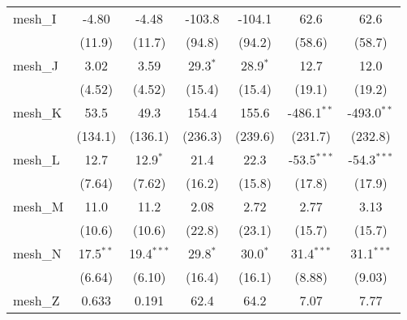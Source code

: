 \begin{tabular}{lcccccc}
   mesh\_I                                                     & -4.80          & -4.48          & -103.8         & -104.1         & 62.6          & 62.6\\   
                                                               & (11.9)         & (11.7)         & (94.8)         & (94.2)         & (58.6)        & (58.7)\\   
   mesh\_J                                                     & 3.02           & 3.59           & 29.3$^{*}$     & 28.9$^{*}$     & 12.7          & 12.0\\   
                                                               & (4.52)         & (4.52)         & (15.4)         & (15.4)         & (19.1)        & (19.2)\\   
   mesh\_K                                                     & 53.5           & 49.3           & 154.4          & 155.6          & -486.1$^{**}$ & -493.0$^{**}$\\   
                                                               & (134.1)        & (136.1)        & (236.3)        & (239.6)        & (231.7)       & (232.8)\\   
   mesh\_L                                                     & 12.7           & 12.9$^{*}$     & 21.4           & 22.3           & -53.5$^{***}$ & -54.3$^{***}$\\   
                                                               & (7.64)         & (7.62)         & (16.2)         & (15.8)         & (17.8)        & (17.9)\\   
   mesh\_M                                                     & 11.0           & 11.2           & 2.08           & 2.72           & 2.77          & 3.13\\   
                                                               & (10.6)         & (10.6)         & (22.8)         & (23.1)         & (15.7)        & (15.7)\\   
   mesh\_N                                                     & 17.5$^{**}$    & 19.4$^{***}$   & 29.8$^{*}$     & 30.0$^{*}$     & 31.4$^{***}$  & 31.1$^{***}$\\   
                                                               & (6.64)         & (6.10)         & (16.4)         & (16.1)         & (8.88)        & (9.03)\\   
   mesh\_Z                                                     & 0.633          & 0.191          & 62.4           & 64.2           & 7.07          & 7.77\\   

\end{tabular}
